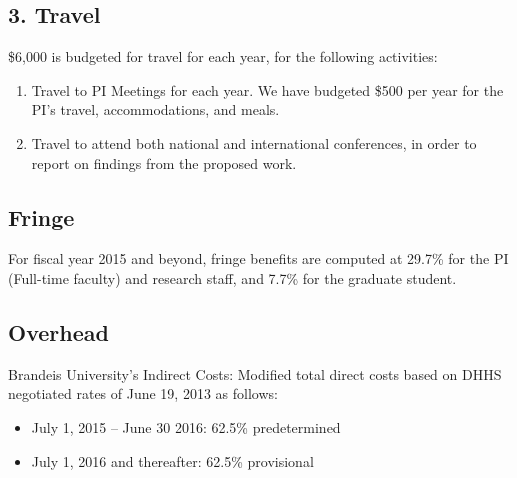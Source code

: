 \documentclass[11pt]{article}
\begin{document}
 
\vspace{-1.0em}
\subsection*{3.  Travel}

\$6,000 is budgeted for travel for each year, for the following activities:

\begin{enumerate}
 
\item Travel to PI Meetings for each year. We have budgeted \$500 per year for the PI's travel,  accommodations, and meals. 
 
\item Travel to attend both national and international conferences, in order to report on findings from the proposed work. 

\end{enumerate}


\subsection*{Fringe}

For fiscal year 2015 and beyond, fringe benefits are computed at 29.7\% for the PI (Full-time faculty) and research staff, and 7.7\% for the graduate student.



\subsection*{Overhead}

Brandeis University's Indirect Costs: Modified total direct costs based on DHHS negotiated rates of June 19, 2013 as follows:
\begin{itemize}
\item July 1, 2015 -- June 30 2016: 62.5\% predetermined
\item July 1, 2016 and thereafter:  62.5\% provisional
\end{itemize}




 
\end{document}
